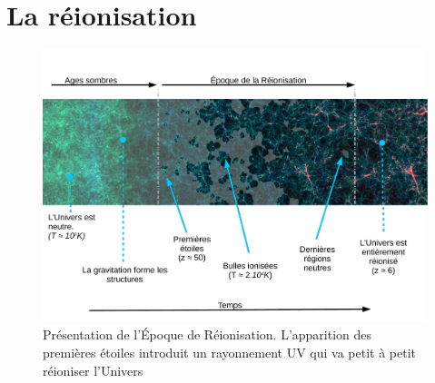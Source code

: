 
\chapter{La réionisation} 
\label{sec:introreio}

%
%
%
%

\begin{figure}
\centering
        \includegraphics[width=\textwidth]{img/01/frise_legend.pdf} 
        \caption[Présentation de l'EoR]{Présentation de l'Époque de Réionisation. 
        L'apparition des premières étoiles introduit un rayonnement UV qui va petit à petit réioniser l'Univers}
 		\label{fig:frise}
\end{figure}


